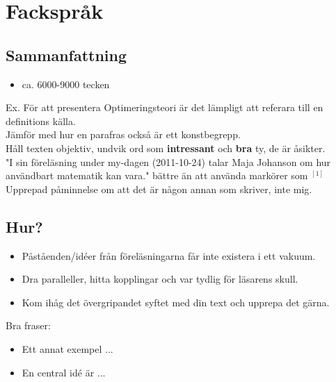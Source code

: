 \chapter{Fackspråk}
\section{Sammanfattning}
\begin{itemize}
	\item ca. 6000-9000 tecken
\end{itemize}
\noindent
Ex. För att presentera Optimeringsteori är det lämpligt att referara till en definitions källa.\\
Jämför med hur en parafras också är ett konstbegrepp.\\
Håll texten objektiv, undvik ord som \textbf{intressant} och \textbf{bra} ty, de är åsikter. \\
"I sin föreläsning under my-dagen (2011-10-24) talar Maja Johanson om hur användbart matematik kan vara." bättre än att använda markörer som ${}^{[1]}$\\
Upprepad påminnelse om att det är någon annan som skriver, inte mig.\\
\section{Hur?}
\begin{itemize}
	\item Påståenden/idéer från föreläsningarna får inte existera i ett vakuum.
	\item Dra paralleller, hitta kopplingar och var tydlig för läsarens skull.
	\item Kom ihåg det övergripandet syftet med din text \textemdash och upprepa det gärna.
\end{itemize}
Bra fraser:
\begin{itemize}
	\item Ett annat exempel ...
	\item En central idé är ...
\end{itemize}
